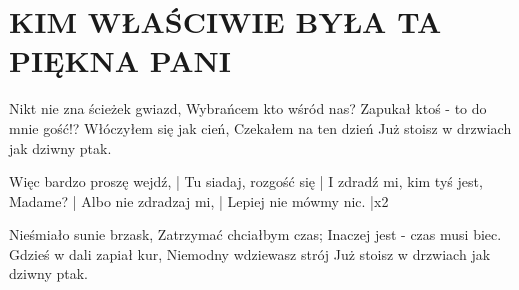\documentclass[../../../songbook.tex]{subfiles}
\begin{document}
\TabPositions{8cm} %
\section*{KIM WŁAŚCIWIE BYŁA TA PIĘKNA PANI}
{}
\vspace{0.5cm}
Nikt nie zna ścieżek gwiazd,			 \newline
Wybrańcem kto wśród nas?				 \newline
Zapukał ktoś - to do mnie gość!?		 \newline
Włóczyłem się jak cień,					 \newline
Czekałem na ten dzień					 \newline
Już stoisz w drzwiach jak dziwny ptak.	 \newline
		
\-\hspace{1cm} Więc bardzo proszę wejdź,			 \quad	| \newline
\-\hspace{1cm} Tu siadaj, rozgość się				 \quad\quad		   | \newline
\-\hspace{1cm} I zdradź mi, kim tyś jest, Madame?	 \quad	| \newline
\-\hspace{1cm} Albo nie zdradzaj mi,				 \quad	| \newline
\-\hspace{1cm} Lepiej nie mówmy nic.				  \quad	|x2 \newline
	
Nieśmiało sunie brzask, \newline
Zatrzymać chciałbym czas; \newline
Inaczej jest - czas musi biec. \newline
Gdzieś w dali zapiał kur, \newline
Niemodny wdziewasz strój \newline
Już stoisz w drzwiach jak dziwny ptak. \newline
	
\end{document}
